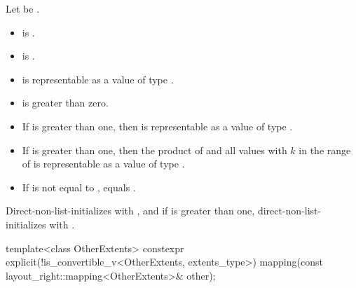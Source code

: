 \begin{itemdescr}
\pnum
Let  be
.

\pnum
\constraints
\begin{itemize}
\item
{} is .
\item
{} is .
\end{itemize}

\pnum
\expects
\begin{itemize}
\item
{} is representable as a value of type .
\item
{} is greater than zero.
\item
If  is greater than one,
then 
is representable as a value of type .
\item
If  is greater than one,
then the product of
 and
all values 
with $k$ in the range of 
is representable as a value of type .
\item
If  is not equal to ,
 equals .
\end{itemize}

\pnum
\effects
Direct-non-list-initializes  with , and
if  is greater than one,
direct-non-list-initializes  with
.
\end{itemdescr}

%
\begin{itemdecl}
template<class OtherExtents>
  constexpr explicit(!is_convertible_v<OtherExtents, extents_type>)
    mapping(const layout_right::mapping<OtherExtents>& other);
\end{itemdecl}

